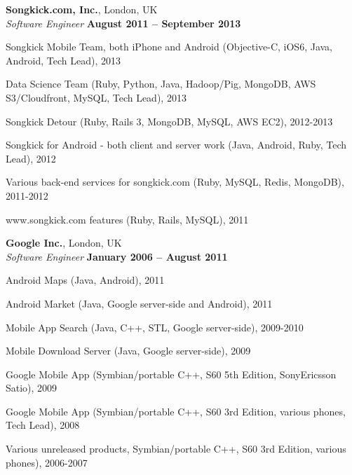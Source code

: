 \documentclass[margin = 0cm,line]{resume}
\begin{document}
\begin{resume}
    \textbf{Songkick.com, Inc.}, London, UK \vspace{2mm}\\\vspace{1mm}%
    \textsl{Software Engineer} \hfill \textbf{August 2011 -- September 2013}\vspace{-3mm}\\\vspace{-1mm}%
    \begin{list2}
        \item Songkick Mobile Team, both iPhone and Android (Objective-C, iOS6, Java, Android, Tech Lead), 2013
        \item Data Science Team (Ruby, Python, Java, Hadoop/Pig, MongoDB, AWS S3/Cloudfront, MySQL, Tech Lead), 2013
        \item Songkick Detour (Ruby, Rails 3, MongoDB, MySQL, AWS EC2), 2012-2013
        \item Songkick for Android - both client and server work (Java, Android, Ruby, Tech Lead), 2012 
        \item Various back-end services for songkick.com (Ruby, MySQL, Redis, MongoDB), 2011-2012
        \item www.songkick.com features (Ruby, Rails, MySQL), 2011
    \end{list2}\vspace{-1.5mm}
    
    \textbf{Google Inc.}, London, UK \vspace{2mm}\\\vspace{1mm}%
    \textsl{Software Engineer} \hfill \textbf{January 2006 -- August 2011}\vspace{-3mm}\\\vspace{-1mm}%
    \begin{list2}
        \item Android Maps (Java,  Android), 2011
        \item Android Market (Java,  Google server-side and Android), 2011
        \item Mobile App Search (Java, C++, STL, Google server-side), 2009-2010
        \item Mobile Download Server (Java, Google server-side), 2009
        \item Google Mobile App (Symbian/portable C++, S60 5th Edition, SonyEricsson Satio), 2009
        \item Google Mobile App (Symbian/portable C++, S60 3rd Edition, various phones, Tech Lead), 2008
        \item Various unreleased products, Symbian/portable C++, S60 3rd Edition, various phones), 2006-2007
    \end{list2}\vspace{-1.5mm}


\end{resume}
\end{document}
